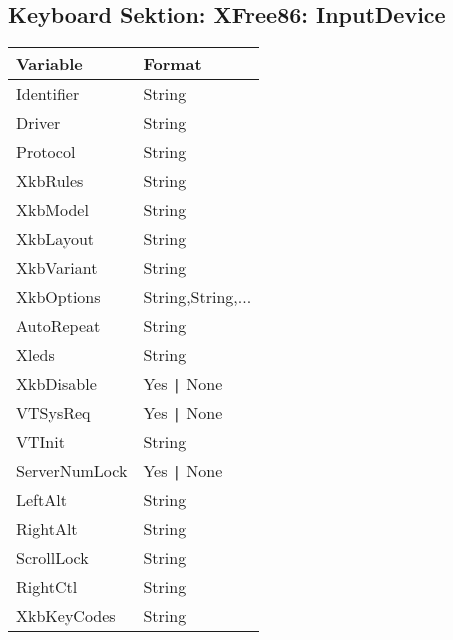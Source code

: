 \subsection{Keyboard Sektion: XFree86: InputDevice}
\begin{tabular}[h]{|p{6cm}|p{7cm}|}
 \hline
 \textbf{Variable}     & \textbf{Format}        \\
 \hline
 Identifier       & String                             \\
 Driver           & String                             \\
 Protocol         & String                             \\
 XkbRules         & String                             \\
 XkbModel         & String                             \\
 XkbLayout        & String                             \\
 XkbVariant       & String                             \\
 XkbOptions       & String,String,...                  \\
 AutoRepeat       & String                             \\
 Xleds            & String                             \\
 XkbDisable       & Yes \verb+|+ None                  \\
 VTSysReq         & Yes \verb+|+ None                  \\
 VTInit           & String                             \\
 ServerNumLock    & Yes \verb+|+ None                  \\
 LeftAlt          & String                             \\
 RightAlt         & String                             \\
 ScrollLock       & String                             \\
 RightCtl         & String                             \\
 XkbKeyCodes      & String                             \\
 \hline
\end{tabular}

\newpage
{}
